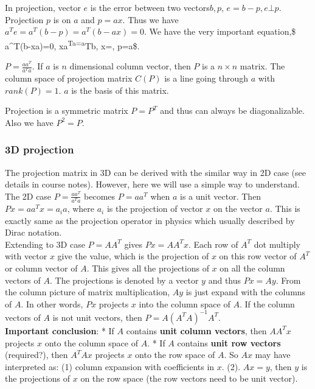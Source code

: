 \documentclass[11pt]{article}
\begin{document}
In projection, vector \(e\) is the error between two vectors\(b, p\),
\(e=b-p, e \bot p\). Projection \(p\) is on \(a\) and \(p=ax\). Thus we
have \(a^Te=a^T(b-p)=a^T(b-ax)=0\). We have the very important
equation,\$ a\^{}T(b-xa)=0, xa\textsuperscript{Ta=a}Tb,
x=, p=a\$.

\(P=\frac{aa^T}{a^Ta}\). If \(a\) is \(n\) dimensional column vector,
then \(P\) is a \(n \times n\) matrix. The column space of projection
matrix \(C(P)\) is a line going through \(a\) with \(rank(P)=1\). \(a\)
is the basis of this matrix.

Projection is a symmetric matrix \(P=P^T\) and thus can always be
diagonalizable. Also we have \(P^2=P\).

    \subsubsection{3D projection}\label{d-projection}

The projection matrix in 3D can be derived with the similar way in 2D
case (see details in course notes). However, here we will use a simple
way to understand. The 2D case \(P=\frac{aa^T}{a^Ta}\) becomes
\(P=aa^T\) when \(a\) is a unit vector. Then \(Px = aa^Tx = a_ia\),
where \(a_i\) is the projection of vector \(x\) on the vector \(a\).
This is exactly same as the projection operator in physics which usually
described by Dirac notation.\\
Extending to 3D case \(P=AA^T\) gives \(Px = AA^Tx\). Each row of
\(A^T\) dot multiply with vector \(x\) give the value, which is the
projection of \(x\) on this row vector of \(A^T\) or column vector of
\(A\). This gives all the projections of \(x\) on all the column vectors
of \(A\). The projections is denoted by a vector \(y\) and thus
\(Px = Ay\). From the column picture of matrix multiplication, \(Ay\) is
just expand with the columns of \(A\). In other words, \(Px\) projects
\(x\) into the column space of \(A\). If the column vectors of \(A\) is
not unit vectors, then \(P = A(A^TA)^{-1}A^T\).\\
\textbf{Important conclusion}: * If \(A\) contains \textbf{unit column
vectors}, then \(AA^Tx\) projects \(x\) onto the column space of \(A\).
* If \(A\) contains \textbf{unit row vectors } (required?), then
\(A^TAx\) projects \(x\) onto the row space of \(A\). So \(Ax\) may have
interpreted as: (1) column expansion with coefficients in \(x\). (2).
\(Ax = y\), then \(y\) is the projections of \(x\) on the row space (the
row vectors need to be unit vector).
\end{document}
